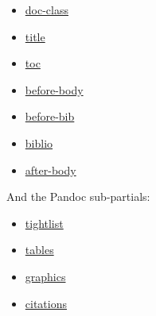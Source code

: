 \documentclass[
  10pt,
  oneside,
  cleardoublepage=empty,
  numbers=noenddot,
  titlepage,
  toclink=all,
  toc=bibliography,
  headinclude,
  footinclude]{scrbook}
\providecommand{\tightlist}{%
  \setlength{\itemsep}{0pt}\setlength{\parskip}{0pt}}\usepackage{longtable,booktabs,array}
\theoremstyle{plain}
\theoremstyle{plain}
\theoremstyle{definition}
\theoremstyle{definition}
\theoremstyle{plain}
\theoremstyle{plain}
\theoremstyle{definition}
\theoremstyle{plain}
\theoremstyle{remark}
\begin{document}
\begin{tcolorbox}[enhanced jigsaw, bottomrule=.15mm, bottomtitle=1mm, rightrule=.15mm, opacityback=0, coltitle=black, colback=white, left=2mm, arc=.35mm, colbacktitle=quarto-callout-note-color!10!white, breakable, toptitle=1mm, colframe=quarto-callout-note-color-frame, toprule=.15mm, titlerule=0mm, title=\textcolor{quarto-callout-note-color}{\faInfo}\hspace{0.5em}{PDF}, leftrule=.75mm, opacitybacktitle=0.6]

\begin{itemize}
\tightlist
\item
  \href{_extensions/templates/tex/doc-class.tex}{doc-class}
\item
  \href{_extensions/templates/tex/title.tex}{title}
\item
  \href{_extensions/templates/tex/toc.tex}{toc}
\item
  \href{_extensions/templates/tex/before-body.tex}{before-body}
\item
  \href{_extensions/templates/tex/before-bib.tex}{before-bib}
\item
  \href{_extensions/templates/tex/biblio.tex}{biblio}
\item
  \href{_extensions/templates/tex/after-body.tex}{after-body}
\end{itemize}

And the Pandoc sub-partials:

\begin{itemize}
\tightlist
\item
  \href{_extensions/templates/tex/tightlist.tex}{tightlist}
\item
  \href{_extensions/templates/tex/tables.tex}{tables}
\item
  \href{_extensions/templates/tex/graphics.tex}{graphics}
\item
  \href{_extensions/templates/tex/citations.tex}{citations}
\end{itemize}

\end{tcolorbox}
\end{document}
